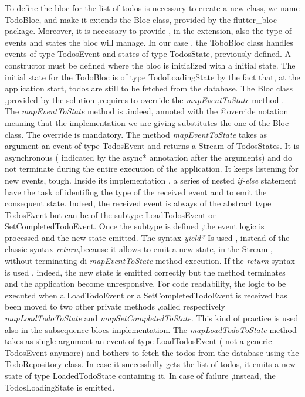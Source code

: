 To define the bloc for the list of todos is necessary to create a new class, we name TodoBloc, and make it extends the Bloc class, provided by the flutter\_bloc package. Moreover, it is necessary to provide , in the extension, also the type of events and states the bloc will manage. In our case , the ToboBloc class handles events of type TodosEvent and states of type TodosState, previously defined. A constructor must be defined where the bloc is initialized with a initial state. The initial state for the TodoBloc is of type TodoLoadingState by the fact that, at the application start, todos are still to be fetched from the database.
The Bloc class ,provided by the solution ,requires to override the \textit{mapEventToState} method . The \textit{mapEventToState} method is ,indeed, annoted with the @override notation meaning that the implementation we are giving substitutes the one of the Bloc class. The override is mandatory. The method \textit{mapEventToState} takes as argument an event of type TodosEvent and returns a Stream of TodosStates. It is asynchronous ( indicated by the async* annotation after the arguments) and do not terminate during the entire execution of the application. It keeps listening for new events, tough. Inside its implementation , a series of nested \textit{if-else }statement have the task of identifing the type of the received event and to emit the consequent state. Indeed, the received event is always of the abstract type TodosEvent but can be of the subtype LoadTodosEvent or SetCompletedTodoEvent. Once the subtype is defined ,the event logic is processed and the new state emitted.  The syntax \textit{yield*} Is used , instead of the classic syntax \textit{return},because it allows to emit a new state, in the Stream , without terminating di \textit{mapEventToState} method execution. If the \textit{return} syntax is used , indeed, the new state is emitted correctly but the method terminates and the application become unresponsive. For code readability, the logic to be executed when a LoadTodoEvent or a SetCompletedTodoEvent is received has been moved to two other private methods ,called respectively \textit{mapLoadTodoToState} and \textit{mapSetCompletedToState}. This kind of practice is used also in the subsequence blocs implementation. The \textit{mapLoadTodoToState} method takes as single argument an event of type LoadTodosEvent ( not a generic TodosEvent anymore) and bothers to fetch the todos from the database using the TodoRepository class. In case it successfully gets the list of todos, it emits a new state of type LoadedTodoState containing it. In case of failure ,instead, the TodosLoadingState is emitted.
